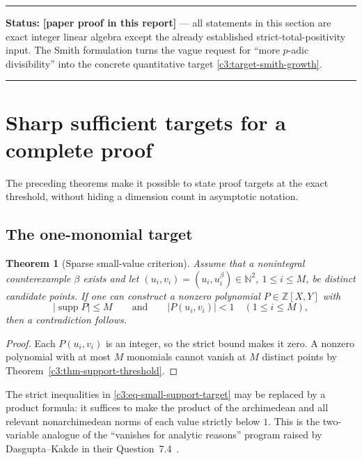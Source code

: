 \documentclass[11pt,oneside]{article}
\newtheorem{theorem}{Theorem}[section]
\theoremstyle{definition}
\theoremstyle{remark}
\newcommand{\N}{\mathbb N}
\newcommand{\Z}{\mathbb Z}
\newcommand{\statusnew}{\textcolor{newgreen}{\textbf{[paper proof in this report]}}}
\newcommand{\supp}{\operatorname{supp}}
\newenvironment{statusbox}[1]
{\begin{center}\begin{minipage}{0.94\textwidth}\raggedright\hbadness=10000\hrule
\vspace{0.45em}\textbf{Status:} #1\par\vspace{0.35em}}
{\vspace{0.35em}\hrule\end{minipage}\end{center}}
\begin{document}
\begin{statusbox}{\statusnew{} --- all statements in this section are exact integer linear
algebra except the already established strict-total-positivity input.  The Smith formulation
turns the vague request for ``more $p$-adic divisibility'' into the concrete quantitative
target \ref{c3:target-smith-growth}.}
\end{statusbox}

\section{Sharp sufficient targets for a complete proof}
\label{sec:auxiliarytarget}

The preceding theorems make it possible to state proof targets at the exact threshold, without
hiding a dimension count in asymptotic notation.

\subsection{The one-monomial target}

\begin{theorem}[Sparse small-value criterion]
\label{c3:thm-small-value-criterion}
Assume that a nonintegral counterexample $\beta$ exists and let
$(u_i,v_i)=(u_i,u_i^\beta)\in\N^2$, $1\le i\le M$, be distinct candidate points.  If one can
construct a nonzero polynomial $P\in\Z[X,Y]$ with
\begin{equation}
 |\supp P|\le M
 \qquad\text{and}\qquad
 |P(u_i,v_i)|<1\quad(1\le i\le M),
 \label{c3:eq-small-support-target}
\end{equation}
then a contradiction follows.
\end{theorem}

\begin{proof}
Each $P(u_i,v_i)$ is an integer, so the strict bound makes it zero.  A nonzero polynomial with
at most $M$ monomials cannot vanish at $M$ distinct points by
Theorem~\ref{c3:thm-support-threshold}.
\end{proof}

The strict inequalities in \eqref{c3:eq-small-support-target} may be replaced by a product
formula: it suffices to make the product of the archimedean and all relevant nonarchimedean
norms of each value strictly below $1$.  This is the two-variable analogue of the
``vanishes for analytic reasons'' program raised by Dasgupta--Kakde in their
Question~7.4~\cite{DasguptaKakde2026}.
\end{document}
